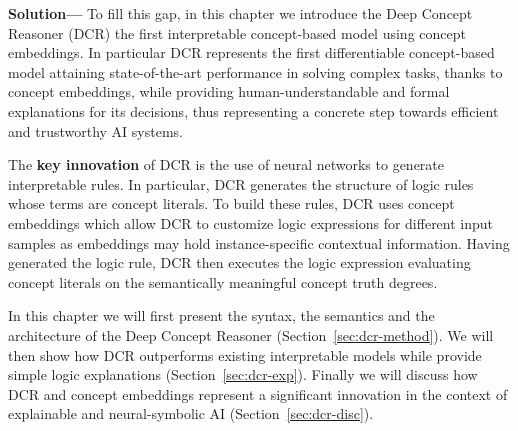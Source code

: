
\textbf{Solution---} To fill this gap, in this chapter we introduce the Deep Concept Reasoner (DCR) the first interpretable concept-based model using concept embeddings. In particular DCR represents the first differentiable concept-based model attaining state-of-the-art performance in solving complex tasks, thanks to concept embeddings, while providing human-understandable and formal explanations for its decisions, thus representing a concrete step towards efficient and trustworthy AI systems.

The \textbf{key innovation} of DCR is the use of neural networks to generate interpretable rules. In particular, DCR generates the structure of logic rules whose terms are concept literals. To build these rules, DCR uses concept embeddings which allow DCR to customize logic expressions for different input samples as embeddings may hold instance-specific contextual information. Having generated the logic rule, DCR then executes the logic expression evaluating concept literals on the semantically meaningful concept truth degrees.

In this chapter we will first present the syntax, the semantics and the architecture of the Deep Concept Reasoner (Section~\ref{sec:dcr-method}). We will then show how DCR outperforms existing interpretable models while provide simple logic explanations (Section~\ref{sec:dcr-exp}). Finally we will discuss how DCR and concept embeddings represent a significant innovation in the context of explainable and neural-symbolic AI (Section~\ref{sec:dcr-disc}).

